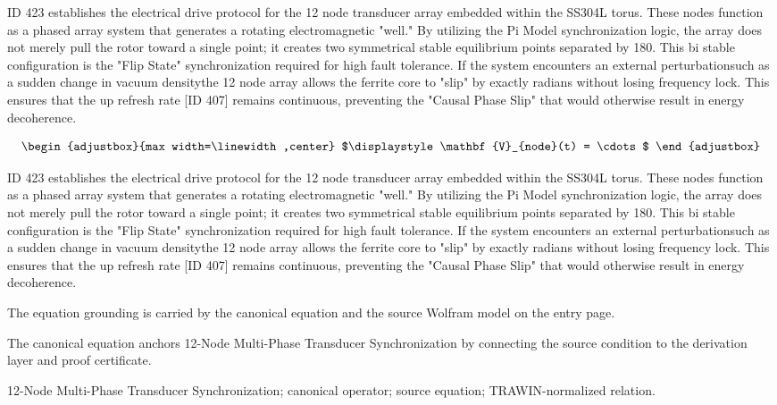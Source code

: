 ID 423 establishes the electrical drive protocol for the 12 node transducer array embedded within the SS304L torus. These nodes function as a phased array system that generates a rotating electromagnetic "well." By utilizing the Pi Model synchronization logic, the array does not merely pull the rotor toward a single point; it creates two symmetrical stable equilibrium points separated by 180. This bi stable configuration is the "Flip State" synchronization required for high fault tolerance. If the system encounters an external perturbationsuch as a sudden change in vacuum densitythe 12 node array allows the ferrite core to "slip" by exactly radians without losing frequency lock. This ensures that the up refresh rate [ID 407] remains continuous, preventing the "Causal Phase Slip" that would otherwise result in energy decoherence.

\[
\begin{adjustbox}{max width=\linewidth,center}
$\displaystyle
\mathbf{V}_{node}(t) = \cdots
$
\end{adjustbox}
\]

ID 423 establishes the electrical drive protocol for the 12 node transducer array embedded within the SS304L torus. These nodes function as a phased array system that generates a rotating electromagnetic "well." By utilizing the Pi Model synchronization logic, the array does not merely pull the rotor toward a single point; it creates two symmetrical stable equilibrium points separated by 180. This bi stable configuration is the "Flip State" synchronization required for high fault tolerance. If the system encounters an external perturbationsuch as a sudden change in vacuum densitythe 12 node array allows the ferrite core to "slip" by exactly radians without losing frequency lock. This ensures that the up refresh rate [ID 407] remains continuous, preventing the "Causal Phase Slip" that would otherwise result in energy decoherence.

The equation grounding is carried by the canonical equation and the source Wolfram model on the entry page.

The canonical equation anchors 12-Node Multi-Phase Transducer Synchronization by connecting the source condition to the derivation layer and proof certificate.

12-Node Multi-Phase Transducer Synchronization; canonical operator; source equation; TRAWIN-normalized relation.
\endgroup

